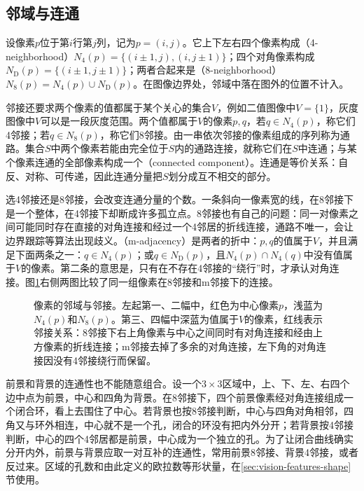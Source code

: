 \subsection{邻域与连通}
\label{sec:vision-formation-connectivity}

设像素$p$位于第$i$行第$j$列，记为$p=(i,j)$。它上下左右四个像素构成（4-neighborhood）$N_4(p)=\{(i\pm1,j),(i,j\pm1)\}$；四个对角像素构成$N_{\mathrm D}(p)=\{(i\pm1,j\pm1)\}$；两者合起来是（8-neighborhood）$N_8(p)=N_4(p)\cup N_{\mathrm D}(p)$。在图像边界处，邻域中落在图外的位置不计入。

邻接还要求两个像素的值都属于某个关心的集合$V$，例如二值图像中$V=\{1\}$，灰度图像中$V$可以是一段灰度范围。两个值都属于$V$的像素$p,q$，若$q\in N_4(p)$，称它们4邻接；若$q\in N_8(p)$，称它们8邻接。由一串依次邻接的像素组成的序列称为通路。集合$S$中两个像素若能由完全位于$S$内的通路连接，就称它们在$S$中连通；与某个像素连通的全部像素构成一个（connected component）。连通是等价关系：自反、对称、可传递，因此连通分量把$S$划分成互不相交的部分。

选4邻接还是8邻接，会改变连通分量的个数。一条斜向一像素宽的线，在8邻接下是一个整体，在4邻接下却断成许多孤立点。8邻接也有自己的问题：同一对像素之间可能同时存在直接的对角连接和经过一个4邻居的折线连接，通路不唯一，会让边界跟踪等算法出现歧义。（m-adjacency）是两者的折中：$p,q$的值属于$V$，并且满足下面两条之一：$q\in N_4(p)$；或$q\in N_{\mathrm D}(p)$，且$N_4(p)\cap N_4(q)$中没有值属于$V$的像素。第二条的意思是，只有在不存在4邻接的“绕行”时，才承认对角连接。图\ref{fig:vision-formation-neighborhoods}右侧两图比较了同一组像素在8邻接和m邻接下的连接。

\begin{figure}[htbp]
  \centering
  
  \caption{像素的邻域与邻接。左起第一、二幅中，红色为中心像素$p$，浅蓝为$N_4(p)$和$N_8(p)$。第三、四幅中深蓝为值属于$V$的像素，红线表示邻接关系：8邻接下右上角像素与中心之间同时有对角连接和经由上方像素的折线连接；m邻接去掉了多余的对角连接，左下角的对角连接因没有4邻接绕行而保留。}
  \label{fig:vision-formation-neighborhoods}
\end{figure}

前景和背景的连通性也不能随意组合。设一个$3\times3$区域中，上、下、左、右四个边中点为前景，中心和四角为背景。在8邻接下，四个前景像素经对角连接组成一个闭合环，看上去围住了中心。若背景也按8邻接判断，中心与四角对角相邻，四角又与环外相连，中心就不是一个孔，闭合的环没有把内外分开；若背景按4邻接判断，中心的四个4邻居都是前景，中心成为一个独立的孔。为了让闭合曲线确实分开内外，前景与背景应取一对互补的连通性，常用前景8邻接、背景4邻接，或者反过来。区域的孔数和由此定义的欧拉数等形状量，在\ref{sec:vision-features-shape}节使用。


